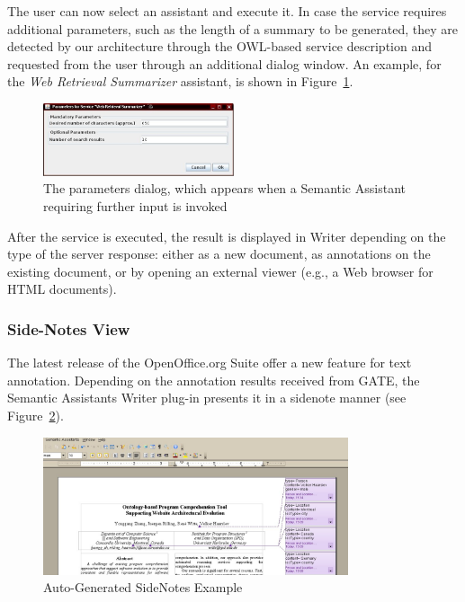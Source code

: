 The user can now select an assistant and execute it. In case the
service requires additional parameters, such as the length of a
summary to be generated, they are detected by our architecture through
the OWL-based service description and requested from the user through
an additional dialog window. An example, for the \emph{Web Retrieval
  Summarizer} assistant, is shown in Figure~\ref{fig:ooparams}.
\begin{figure}[htb]
  \centering
  \includegraphics[width=0.5\textwidth]{pictures/ooparams.jpg}
  \caption{The parameters dialog, which appears when a Semantic
    Assistant requiring further input is invoked}
  \label{fig:ooparams}
\end{figure}
After the service is executed, the result is displayed in Writer depending on
the type of the server response: either as a new document, as annotations on
the existing document, or by opening an external viewer (e.g., a Web browser
for HTML documents).

\subsubsection{Side-Notes View}
The latest release of the OpenOffice.org Suite offer a new feature for text
annotation.  Depending on the annotation results received from GATE, the
Semantic Assistants Writer plug-in presents it in a sidenote manner (see
Figure~\ref{fig:sidenotes}).
\begin{figure}[htb]
  \centering
  \includegraphics[width=0.8\textwidth]{pictures/sidenotes.jpg}
  \caption{Auto-Generated SideNotes Example}
  \label{fig:sidenotes}
\end{figure}


